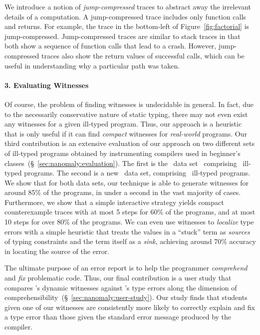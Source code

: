 We introduce a notion of \emph{jump-compressed} traces to abstract away
the irrelevant details of a computation.
%
A jump-compressed trace includes only function
calls and returns. For example, the trace in the bottom-left of
Figure~\ref{fig:factorial} is jump-compressed.
%
Jump-compressed traces are similar to stack traces in that both show a
sequence of function calls that lead to a crash. However, jump-compressed
traces also show the return values of successful calls, which can be
useful in understanding why a particular path was taken.

\paragraph{3. Evaluating Witnesses}
%
Of course, the problem of finding witnesses is
undecidable in general. In fact, due to the necessarily
conservative nature of static typing, there
may not even exist any witnesses for a given
ill-typed program.
%
Thus, our approach is a heuristic that is only useful
if it can find \emph{compact} witnesses for
\emph{real-world} programs.
%
Our third contribution is an extensive evaluation of our approach
on two different sets of ill-typed programs obtained by instrumenting
compilers used in beginner's classes~(\S~\ref{sec:nanomaly:evaluation}).
%
The first is the \uwbench\ data set~\cite{Lerner2007-dt}
comprising \uwsize\ ill-typed programs.
%
The second is a new \ucsdbench\ data set, comprising \ucsdsize\
ill-typed programs.
%
We show that for both data sets, our technique is able to generate
witnesses for around 85\% of the programs, in under a second in the
vast majority of cases.
%
Furthermore, we show that a simple interactive strategy yields
compact counterexample traces with at most 5 steps for 60\%
of the programs, and at most 10 steps for over 80\% of the programs.
%
We can even use witnesses to \emph{localize} type errors with a simple
heuristic that treats the values in a ``stuck'' term as \emph{sources}
of typing constraints and the term itself as a \emph{sink},
achieving around 70\% accuracy in locating the source of the error.

The ultimate purpose of an error report is to help the programmer
\emph{comprehend} and \emph{fix} problematic code.
%
Thus, our final contribution is a user study that compares \toolname's
dynamic witnesses against \ocaml's type errors along the dimension of
comprehensibility~(\S~\ref{sec:nanomaly:user-study}).
%
Our study finds that students given one of our witnesses are
consistently more likely to correctly explain and fix a type
error than those given the standard error message produced by
the \ocaml compiler.


